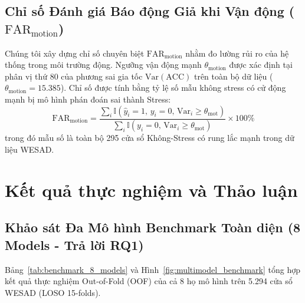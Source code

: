 \documentclass[conference]{IEEEtran}
\begin{document}
\subsection{Chỉ số Đánh giá Báo động Giả khi Vận động \texorpdfstring{($\text{FAR}_{\text{motion}}$)}{(FAR-motion)}}
Chúng tôi xây dựng chỉ số chuyên biệt $\text{FAR}_{\text{motion}}$ nhằm đo lường rủi ro của hệ thống trong môi trường động. Ngưỡng vận động mạnh $\theta_{\text{motion}}$ được xác định tại phân vị thứ 80 của phương sai gia tốc $\text{Var}(\text{ACC})$ trên toàn bộ dữ liệu ($\theta_{\text{motion}} = 15.385$). Chỉ số được tính bằng tỷ lệ số mẫu không stress có cử động mạnh bị mô hình phán đoán sai thành Stress:
\begin{equation}
\text{FAR}_{\text{motion}} = \frac{\sum_{i} \mathbb{I}(\hat{y}_i = 1,\, y_i = 0,\, \text{Var}_i \ge \theta_{\text{mot}})}{\sum_{i} \mathbb{I}(y_i = 0,\, \text{Var}_i \ge \theta_{\text{mot}})} \times 100\%
\end{equation}
trong đó mẫu số là toàn bộ 295 cửa sổ Không-Stress có rung lắc mạnh trong dữ liệu WESAD.

\section{Kết quả thực nghiệm và Thảo luận}

\subsection{Khảo sát Đa Mô hình Benchmark Toàn diện (8 Models - Trả lời RQ1)}

Bảng~\ref{tab:benchmark_8_models} và Hình~\ref{fig:multimodel_benchmark} tổng hợp kết quả thực nghiệm Out-of-Fold (OOF) của cả 8 họ mô hình trên 5.294 cửa sổ WESAD (LOSO 15-folds).
\end{document}
